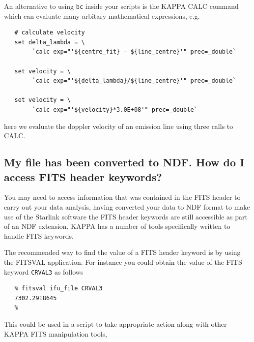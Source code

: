 \documentclass[twoside,11pt]{article}
\newcommand{\htmlref}[2]{#1}
\newcommand{\xref}[3]{#1}
\newcommand{\xlabel}[1]{}
\begin{document}
An alternative to using {\tt bc} inside your scripts is the KAPPA \xref{CALC}{sun95}{CALC} command which can evaluate many arbitary mathematical expressions, e.g.

\small\begin{verbatim}
   # calculate velocity
   set delta_lambda = \
        `calc exp="'${centre_fit} - ${line_centre}'" prec=_double`

   set velocity = \
        `calc exp="'${delta_lambda}/${line_centre}'" prec=_double`

   set velocity = \
        `calc exp="'${velocity}*3.0E+08'" prec=_double`
\end{verbatim}\normalsize

here we evaluate the doppler velocity of an emission line using three calls to CALC.

\subsection{\xlabel{sc16_fitsheader}My file has been converted to NDF. How do I access FITS header keywords?\label{sc16_fitsheader}}

You may need to access information that was contained in the FITS header to carry out your data analysis, having converted your data to NDF format to make use of the Starlink software the FITS header keywords are still accessible as part of an NDF extension. \xref{KAPPA}{sun95}{} has a number of tools specifically written to handle \xref{FITS keywords}{sun95}{se_fitsairlock}.

The recommended way to find the value of a FITS header keyword is by using the \xref{FITSVAL}{sun95}{FITSVAL} application. For instance you could obtain the value of the FITS keyword \htmlref{{\tt CRVAL3}}{sc16_teifufile} as follows

\small\begin{verbatim}
   % fitsval ifu_file CRVAL3
   7302.2918645
   %
\end{verbatim}\normalsize

This could be used in a script to take appropriate action along with other \xref{KAPPA}{sun95}{se_fitsairlock} FITS manipulation tools,
\end{document}
